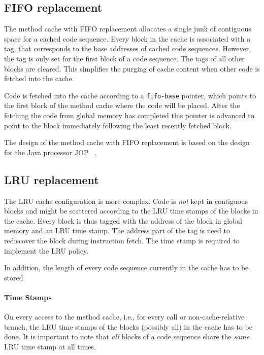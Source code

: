 \documentclass[a4paper,fontsize=10pt,twoside,DIV15,BCOR12mm,headinclude=true,footinclude=false,pagesize,bibtotoc]{scrbook}
\begin{document}
\subsection{FIFO replacement}

The method cache with FIFO replacement allocates a single junk of contiguous
space for a cached code sequence. Every block in the cache is associated with a
tag, that corresponds to the base addresses of cached code sequences. However,
the tag is only set for the first block of a code sequence. The tags of all
other blocks are cleared. This simplifies the purging of cache content when
other code is fetched into the cache.

Code is fetched into the cache according to a \texttt{fifo-base} pointer, which
points to the first block of the method cache where the code will be placed.
After the fetching the code from global memory has completed this pointer is
advanced to point to the block immediately following the least recently fetched
block.

The design of the method cache with FIFO replacement is based on the
design for the Java processor JOP~\cite{jop:jtres_cache} .

\subsection{LRU replacement}

The LRU cache configuration is more complex. Code is \emph{not} kept in
contiguous blocks and might be scattered according to the LRU time stamps of the
blocks in the cache. Every block is thus tagged with the address of the block
in global memory and an LRU time stamp. The address part of the tag is need to
rediscover the block during instruction fetch. The time stamp is required to
implement the LRU policy.

In addition, the length of every code sequence currently in the cache has to be
stored.

\paragraph*{Time Stamps}
On every access to the method cache, i.e., for every call or non-cache-relative
branch, the LRU time stamps of the blocks (possibly all) in the cache has to be
done. It is important to note that \emph{all} blocks of a code sequence share
the \emph{same} LRU time stamp at all times.
\end{document}

